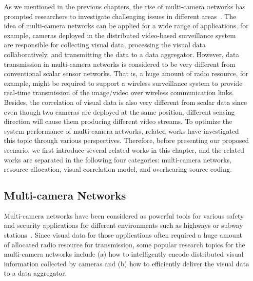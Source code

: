 As we mentioned in the previous chapters, the rise of multi-camera networks has prompted researchers to investigate challenging issues in different areas~\cite{VsnChallenges}.
The idea of multi-camera networks can be applied for a wide range of applications, for example, cameras deployed in the distributed video-based surveillance system~\cite{VideoBasedSurveillanceSystem} are responsible for collecting visual data, processing the visual data collaboratively, and transmitting the data to a data aggregator.
However, data transmission in multi-camera networks is considered to be very different from conventional scalar sensor networks.
That is, a huge amount of radio resource, for example, might be required to support a wireless surveillance system to provide real-time transmission of the image/video over wireless communication links.
Besides, the correlation of visual data is also very different from scalar data since even though two cameras are deployed at the same position, different sensing direction will cause them producing different video streams.
To optimize the system performance of multi-camera networks, related works have investigated this topic through various perspectives.
Therefore, before presenting our proposed scenario, we first introduce several related works in this chapter, and the related works are separated in the following four categories: multi-camera networks, resource allocation, visual correlation model, and overhearing source coding.
%
\subsection{Multi-camera Networks}
Multi-camera networks have been considered as powerful tools for various safety and security applications for different environments such as highways or subway stations~\cite{MultiCameraNetworksBook}.
Since visual data for those applications often required a huge amount of allocated radio resource for transmission, some popular research topics for the multi-camera networks include (a) how to intelligently encode distributed visual information collected by cameras and (b) how to efficiently deliver the visual data to a data aggregator.

